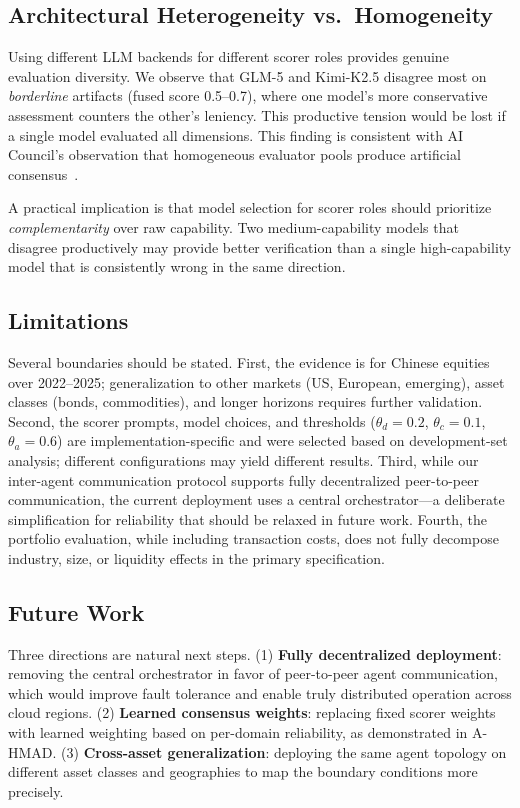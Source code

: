 \documentclass[sigconf]{acmart}
\begin{document}
\subsection{Architectural Heterogeneity vs.\ Homogeneity}

Using different LLM backends for different scorer roles provides genuine evaluation diversity. We observe that GLM-5 and Kimi-K2.5 disagree most on \textit{borderline} artifacts (fused score 0.5--0.7), where one model's more conservative assessment counters the other's leniency. This productive tension would be lost if a single model evaluated all dimensions. This finding is consistent with AI Council's observation that homogeneous evaluator pools produce artificial consensus~\cite{ghafarollahi2024sciagents}.

A practical implication is that model selection for scorer roles should prioritize \textit{complementarity} over raw capability. Two medium-capability models that disagree productively may provide better verification than a single high-capability model that is consistently wrong in the same direction.

\subsection{Limitations}

Several boundaries should be stated. First, the evidence is for Chinese equities over 2022--2025; generalization to other markets (US, European, emerging), asset classes (bonds, commodities), and longer horizons requires further validation. Second, the scorer prompts, model choices, and thresholds ($\theta_d=0.2$, $\theta_c=0.1$, $\theta_a=0.6$) are implementation-specific and were selected based on development-set analysis; different configurations may yield different results. Third, while our inter-agent communication protocol supports fully decentralized peer-to-peer communication, the current deployment uses a central orchestrator---a deliberate simplification for reliability that should be relaxed in future work. Fourth, the portfolio evaluation, while including transaction costs, does not fully decompose industry, size, or liquidity effects in the primary specification.

\subsection{Future Work}

Three directions are natural next steps. (1) \textbf{Fully decentralized deployment}: removing the central orchestrator in favor of peer-to-peer agent communication, which would improve fault tolerance and enable truly distributed operation across cloud regions. (2) \textbf{Learned consensus weights}: replacing fixed scorer weights with learned weighting based on per-domain reliability, as demonstrated in A-HMAD. (3) \textbf{Cross-asset generalization}: deploying the same agent topology on different asset classes and geographies to map the boundary conditions more precisely.
\end{document}
